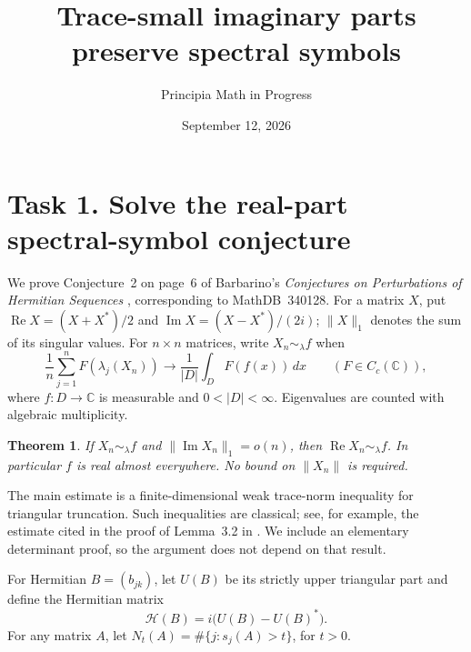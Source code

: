 \documentclass[11pt]{article}
\title{Trace-small imaginary parts preserve spectral symbols}
\author{Principia Math in Progress}
\date{September 12, 2026}
\newtheorem{theorem}{Theorem}
\newcommand{\Rea}{\operatorname{Re}}
\newcommand{\Ima}{\operatorname{Im}}
\newcommand{\HH}{\mathcal H}
\begin{document}
\maketitle

\section*{Task 1. Solve the real-part spectral-symbol conjecture}
We prove Conjecture~2 on page~6 of Barbarino's
\emph{Conjectures on Perturbations of Hermitian Sequences}
\cite{Barbarino}, corresponding to MathDB~340128.
For a matrix \(X\), put
\(\Rea X=(X+X^*)/2\) and \(\Ima X=(X-X^*)/(2i)\);
\(\|X\|_1\) denotes the sum of its singular values.
For \(n\times n\) matrices, write \(X_n\sim_\lambda f\) when
\[
 \frac1n\sum_{j=1}^n F(\lambda_j(X_n))
 \longrightarrow \frac1{|D|}\int_D F(f(x))\,dx
 \qquad(F\in C_c(\mathbb C)),
 \tag{1}
\]
where \(f:D\to\mathbb C\) is measurable and \(0<|D|<\infty\).
Eigenvalues are counted with algebraic multiplicity.

\begin{theorem}\label{main}
If \(X_n\sim_\lambda f\) and \(\|\Ima X_n\|_1=o(n)\), then
\(\Rea X_n\sim_\lambda f\). In particular \(f\) is real almost everywhere.
No bound on \(\|X_n\|\) is required.
\end{theorem}

The main estimate is a finite-dimensional weak trace-norm inequality
for triangular truncation. Such inequalities are classical; see, for
example, the estimate cited in the proof of Lemma~3.2 in \cite{CPSZ}.
We include an elementary determinant proof, so the argument does not
depend on that result.

For Hermitian \(B=(b_{jk})\), let \(U(B)\) be its strictly upper triangular
part and define the Hermitian matrix
\[
 \HH(B)=i\bigl(U(B)-U(B)^*\bigr).
\]
For any matrix \(A\), let \(N_t(A)=\#\{j:s_j(A)>t\}\), for \(t>0\).
\end{document}
